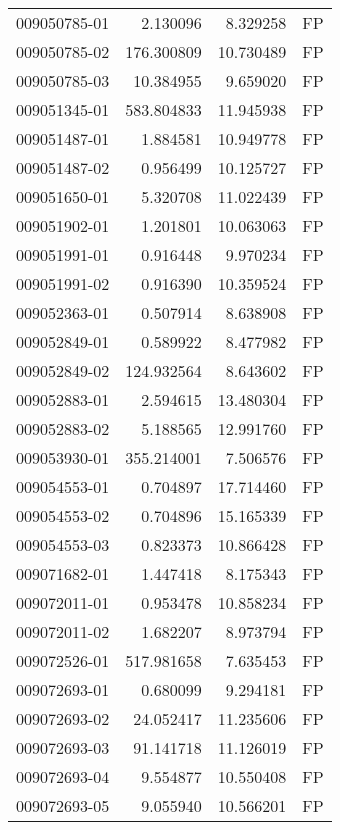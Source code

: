 \begin{tabular}{lrrl}
009050785-01 &    2.130096 &       8.329258 &   FP \\
009050785-02 &  176.300809 &      10.730489 &   FP \\
009050785-03 &   10.384955 &       9.659020 &   FP \\
009051345-01 &  583.804833 &      11.945938 &   FP \\
009051487-01 &    1.884581 &      10.949778 &   FP \\
009051487-02 &    0.956499 &      10.125727 &   FP \\
009051650-01 &    5.320708 &      11.022439 &   FP \\
009051902-01 &    1.201801 &      10.063063 &   FP \\
009051991-01 &    0.916448 &       9.970234 &   FP \\
009051991-02 &    0.916390 &      10.359524 &   FP \\
009052363-01 &    0.507914 &       8.638908 &   FP \\
009052849-01 &    0.589922 &       8.477982 &   FP \\
009052849-02 &  124.932564 &       8.643602 &   FP \\
009052883-01 &    2.594615 &      13.480304 &   FP \\
009052883-02 &    5.188565 &      12.991760 &   FP \\
009053930-01 &  355.214001 &       7.506576 &   FP \\
009054553-01 &    0.704897 &      17.714460 &   FP \\
009054553-02 &    0.704896 &      15.165339 &   FP \\
009054553-03 &    0.823373 &      10.866428 &   FP \\
009071682-01 &    1.447418 &       8.175343 &   FP \\
009072011-01 &    0.953478 &      10.858234 &   FP \\
009072011-02 &    1.682207 &       8.973794 &   FP \\
009072526-01 &  517.981658 &       7.635453 &   FP \\
009072693-01 &    0.680099 &       9.294181 &   FP \\
009072693-02 &   24.052417 &      11.235606 &   FP \\
009072693-03 &   91.141718 &      11.126019 &   FP \\
009072693-04 &    9.554877 &      10.550408 &   FP \\
009072693-05 &    9.055940 &      10.566201 &   FP \\

\end{tabular}
